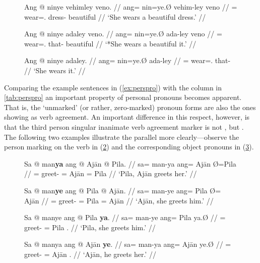 \begin{figure}[h]
\pex\label{ex:procompldist}
\a\begingl
	\gla Ang @ ninye vehimley veno. //
	\glb ang= nin=ye.Ø vehim-ley veno //
	\glc \AgtT{}= wear=\TsgF{}.\Top{} dress-\PargI{} beautiful //
	\glft `She wears a beautiful dress.' //
\endgl

\a\ljudge* \begingl
	\gla Ang @ ninye adaley veno. //
	\glb ang= nin=ye.Ø ada-ley veno //
	\glc \AgtT{}= wear=\TsgF{}.\Top{} that-\PargI{} beautiful //
	\glft `*She wears a beautiful it.' //
\endgl

\a\begingl
	\gla Ang @ ninye adaley. //
	\glb ang= nin=ye.Ø ada-ley //
	\glc \AgtT{}= wear=\TsgF{}.\Top{} that-\PargI{} //
	\glft `She wears it.' //
\endgl
\xe
\end{figure}

Comparing the example sentences in (\ref{ex:perspro}) with the \Top{} column
in \autoref{tab:perspro} an important property of personal pronouns becomes 
apparent. That is, the `unmarked' (or rather, zero-marked) pronoun forms are 
also the ones showing as verb agreement. An important difference in this 
respect, however, is that the third person singular inanimate verb agreement 
marker is not , but . The following two examples 
illustrate the parallel more clearly---observe the person marking on the verb 
in (\ref{ex:verbinfl1}) and the corresponding object pronouns in 
(\ref{ex:verbinfl2}).

\begin{figure}
\pex\label{ex:verbinfl1}
\a\begingl
	\gla Sa @ man\textbf{ya} ang @ Ajān {} @ Pila. //
	\glb sa= man-ya ang= ​Ajān Ø= ​Pila //
	\glc \PatT{}= greet-\TsgM{} \Aarg{}= ​Ajān \Top{}= ​Pila //
	\glft `Pila, Ajān greets her.' //
\endgl

\a\begingl
	\gla Sa @ man\textbf{ye} ang @ Pila {} @ Ajān. //
	\glb sa= man-ye ang= Pila Ø= ​Ajān //
	\glc \PatT{}= greet-\TsgF{} \Aarg{}= Pila \Top{}= ​Ajān //
	\glft `Ajān, she greets him.' //
\endgl

\xe
\end{figure}

\begin{figure}
\pex\label{ex:verbinfl2}
\a\begingl
	\gla Sa @ manye ang @ Pila \textbf{ya}. //
	\glb sa= man-ye ang= Pila ya.Ø //
	\glc \PatT{}= greet-\TsgF{} \Aarg{}= Pila \TsgM{}.\Top{} //
	\glft `Pila, she greets him.' //
\endgl

\a\begingl
	\gla Sa @ manya ang @ Ajān \textbf{ye}. //
	\glb sa= man-ya ang= ​Ajān ye.Ø //
	\glc \PatT{}= greet-\TsgM{} \Aarg{}= ​Ajān \TsgF{}.\Top{} //
	\glft `Ajān, he greets her.' //
\endgl
\xe
\end{figure}

